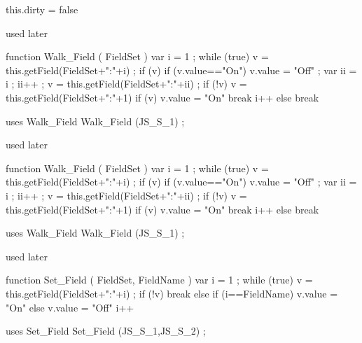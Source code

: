   this.dirty = false   \stopJScode

 used later 

function Walk_Field ( FieldSet ) 
  { var i = 1 ; 
    while (true) 
      { v = this.getField(FieldSet+":"+i) ; 
        if (v) 
          { if (v.value=="On") 
              { v.value = "Off" ; 
                var ii = i ; ii++ ; 
                v = this.getField(FieldSet+":"+ii) ; 
                if (!v) 
                  { v = this.getField(FieldSet+":"+1) }
                if (v) 
                  { v.value = "On" }
                break }  
            i++ } 
        else
          { break } } }

\stopJSpreamble

 uses {Walk_Field} 
  Walk_Field (JS_S_1) ; 
\stopJScode

 used later 

function Walk_Field ( FieldSet ) 
  { var i = 1 ; 
    while (true) 
      { v = this.getField(FieldSet+":"+i) ; 
        if (v) 
          { if (v.value=="On") 
              { v.value = "Off" ; 
                var ii = i ; ii++ ; 
                v = this.getField(FieldSet+":"+ii) ; 
                if (!v) 
                  { v = this.getField(FieldSet+":"+1) }
                if (v) 
                  { v.value = "On" }
                break }
            i++ } 
        else
          { break } } }

\stopJSpreamble

 uses {Walk_Field} 
  Walk_Field (JS_S_1) ; 
\stopJScode

 used later 

function Set_Field ( FieldSet, FieldName ) 
  { var i = 1 ; 
    while (true) 
      { v = this.getField(FieldSet+":"+i) ; 
        if (!v) 
          { break }  
        else if (i==FieldName) 
          { v.value = "On" }
        else 
          { v.value = "Off" } 
        i++ } } 

\stopJSpreamble

 uses {Set_Field} 
  Set_Field (JS_S_1,JS_S_2) ; 
\stopJScode

\endinput

